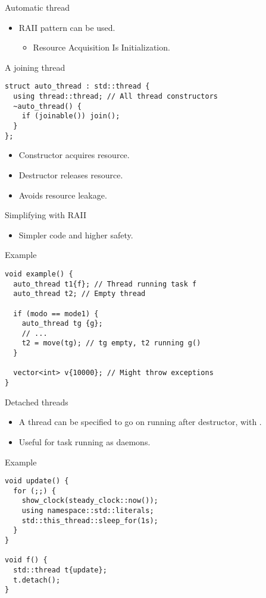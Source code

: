 \begin{frame}[fragile]{Automatic thread}
\begin{itemize}
  \item RAII pattern can be used.
    \begin{itemize}
      \item Resource Acquisition Is Initialization.
    \end{itemize}
\end{itemize}
\begin{block}{A joining thread}
\begin{lstlisting}
struct auto_thread : std::thread {
  using thread::thread; // All thread constructors
  ~auto_thread() { 
    if (joinable()) join(); 
  }
};
\end{lstlisting}
\end{block}
\begin{itemize}
  \item Constructor acquires resource.
  \item Destructor releases resource.
  \item Avoids resource leakage.
\end{itemize}
\end{frame}

\begin{frame}[t,fragile]{Simplifying with RAII}
\begin{itemize}
  \item Simpler code and higher safety.
\end{itemize}
\begin{block}{Example}
\begin{lstlisting}
void example() {
  auto_thread t1{f}; // Thread running task f
  auto_thread t2; // Empty thread

  if (modo == mode1) {
    auto_thread tg {g}; 
    // ...
    t2 = move(tg); // tg empty, t2 running g()
  }

  vector<int> v{10000}; // Might throw exceptions
}
\end{lstlisting}
\end{block}
\end{frame}

\begin{frame}[t,fragile]{Detached threads}
\begin{itemize}
  \item A thread can be specified to go on running after destructor, with .
  \item Useful for task running as daemons.
\end{itemize}
\begin{block}{Example}
\begin{lstlisting}[basicstyle=\tiny]
void update() {
  for (;;) {
    show_clock(steady_clock::now());
    using namespace::std::literals;
    std::this_thread::sleep_for(1s);
  }
}

void f() {
  std::thread t{update};
  t.detach();
}
\end{lstlisting}
\end{block}
\end{frame}

